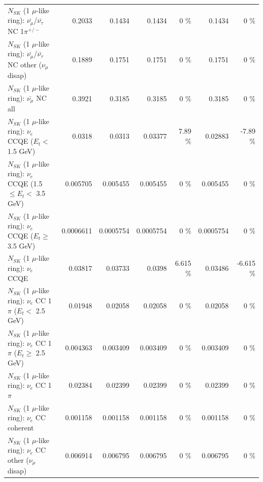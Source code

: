 \begin{table}
\begin{tabular}{| l | r | r | r  r | r  r |}
\hline
  $N_{SK}$ (1 $\mu$-like ring): $\bar{\nu_\mu}$/$\bar{\nu_\tau}$ NC 1$\pi^{+/-}$ &          0.2033 &          0.1434 &          0.1434 &        0 \%  &          0.1434 &        0 \%  \\ 
$N_{SK}$ (1 $\mu$-like ring): $\bar{\nu_\mu}$/$\bar{\nu_\tau}$ NC other ($\nu_\mu$ disap) &          0.1889 &          0.1751 &          0.1751 &        0 \%  &          0.1751 &        0 \%  \\ 
                          $N_{SK}$ (1 $\mu$-like ring): $\bar{\nu_{\mu}}$ NC all &          0.3921 &          0.3185 &          0.3185 &        0 \%  &          0.3185 &        0 \%  \\ 
\hline
\hline
\hline
                  $N_{SK}$ (1 $\mu$-like ring): $\nu_e$ CCQE ($E_{t} <$ 1.5 GeV) &          0.0318 &          0.0313 &         0.03377 &     7.89 \%  &         0.02883 &    -7.89 \%  \\ 
         $N_{SK}$ (1 $\mu$-like ring): $\nu_e$ CCQE (1.5 $\leq E_{t} <$ 3.5 GeV) &        0.005705 &        0.005455 &        0.005455 &        0 \%  &        0.005455 &        0 \%  \\ 
               $N_{SK}$ (1 $\mu$-like ring): $\nu_e$ CCQE ($E_{t} \geq$ 3.5 GeV) &       0.0006611 &       0.0005754 &       0.0005754 &        0 \%  &       0.0005754 &        0 \%  \\ 
\hline
                                      $N_{SK}$ (1 $\mu$-like ring): $\nu_e$ CCQE &         0.03817 &         0.03733 &          0.0398 &    6.615 \%  &         0.03486 &   -6.615 \%  \\ 
\hline
             $N_{SK}$ (1 $\mu$-like ring): $\nu_e$ CC 1$\pi$ ($E_{t} <$ 2.5 GeV) &         0.01948 &         0.02058 &         0.02058 &        0 \%  &         0.02058 &        0 \%  \\ 
          $N_{SK}$ (1 $\mu$-like ring): $\nu_e$ CC 1$\pi$ ($E_{t} \geq$ 2.5 GeV) &        0.004363 &        0.003409 &        0.003409 &        0 \%  &        0.003409 &        0 \%  \\ 
\hline
                                 $N_{SK}$ (1 $\mu$-like ring): $\nu_e$ CC 1$\pi$ &         0.02384 &         0.02399 &         0.02399 &        0 \%  &         0.02399 &        0 \%  \\ 
                               $N_{SK}$ (1 $\mu$-like ring): $\nu_e$ CC coherent &        0.001158 &        0.001158 &        0.001158 &        0 \%  &        0.001158 &        0 \%  \\ 
                $N_{SK}$ (1 $\mu$-like ring): $\nu_e$ CC other ($\nu_\mu$ disap) &        0.006914 &        0.006795 &        0.006795 &        0 \%  &        0.006795 &        0 \%  \\ 

\end{tabular}
\end{table}
